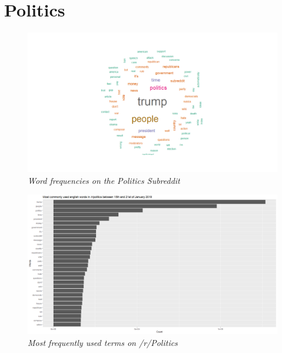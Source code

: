 \section{Politics}
\label{sec:politics}

\begin{figure}[ht]
    \centering
    \includegraphics[width=1.0\textwidth]{graphs/politics/Wordcloud_rpolitics.png}
    \caption{\textit{Word frequencies on the Politics Subreddit}}
    \label{fig:politics_cloud}
\end{figure}

\begin{figure}[H]
    \centering
    \includegraphics[width=1.0\textwidth]{graphs/politics/Bargraph_rPolitics.png}
    \caption{\textit{Most frequently used terms on /r/Politics}}
    \label{fig:politics_wordfreq}
\end{figure}

